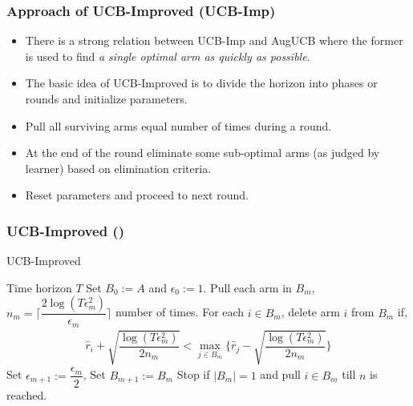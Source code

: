\begin{frame}
\frametitle{Approach of UCB-Improved (UCB-Imp)}
\begin{itemize}
\item<1-> There is a strong relation between UCB-Imp and AugUCB where the former is used to find \emph{a single optimal arm as quickly as possible}.
\item<2-> The basic idea of UCB-Improved is to divide the horizon into phases or rounds and initialize parameters.
\item<3-> Pull all surviving arms equal number of times during a round.
\item<4-> At the end of the round eliminate some sub-optimal arms (as judged by learner) based on elimination criteria.
\item<5-> Reset parameters and proceed to next round.
\end{itemize}
\end{frame}

\begin{frame}
\frametitle{UCB-Improved (\cite{auer2010ucb})}
\begin{algorithm}[H]
\caption{UCB-Improved}
\small
\begin{algorithmic}[1]
 Time horizon $T$
 Set $B_{0}:=A$ and ${\epsilon}_{0}:=1$.
\State Pull each arm in $B_m$, $n_{m}=\bigg\lceil\dfrac{2\log{( T{\epsilon}_{m}^{2})}}{{\epsilon}_{m}}\bigg\rceil$ number of times.
\ArmElim
\State For each $i \in B_{m}$, delete arm ${i}$ from $B_{m}$ if,
\begin{align*}
\hat{r}_{i} + \sqrt{\dfrac{\log{(T{\epsilon}_{m}^{2})}}{2 n_{m}}}  < \max_{{j}\in B_{m}}\bigg\lbrace\hat{r}_{j} -\sqrt{\dfrac{\log{( T{\epsilon}_{m}^{2})}}{2 n_{m}}} \bigg\rbrace
\end{align*}
\EndArmElim
\State Set ${\epsilon}_{m+1}:=\dfrac{{\epsilon}_{m}}{2}$, Set $B_{m+1}:=B_{m}$
\State Stop if $|B_{m}|=1$ and pull ${i}\in B_{m}$ till $n$ is reached.
\EndFor
\end{algorithmic}
\end{algorithm}
\end{frame}

